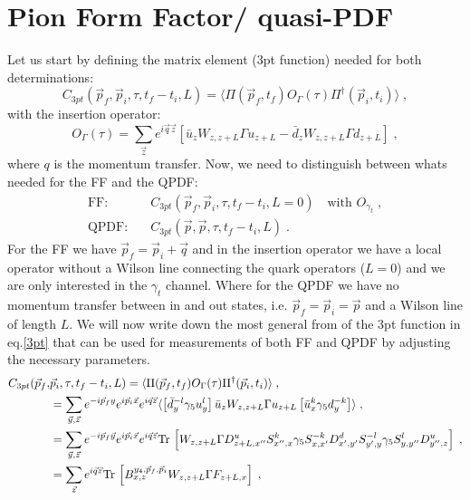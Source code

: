 \documentclass[a4paper,10pt]{scrartcl}
\newcommand{\tr}{\text{Tr\,}}
\begin{document}



\section{Pion Form Factor/ quasi-PDF}
Let us start by defining the matrix element (3pt function) needed for both determinations:
\begin{equation}
    C_{3pt}(\vec p_f,\vec p_i,\tau,t_f-t_i,L) = \langle \Pi (\vec p_f, t_f) O_{\Gamma}(\tau) \Pi^\dagger (\vec p_i, t_i) \rangle \; , \label{3pt}
\end{equation}
with the insertion operator:
\begin{equation}
    O_\Gamma(\tau) = \sum_{\vec z} e^{i \vec q \vec z} \left[ \bar u_z W_{z,z+L} \Gamma u_{z+L} - \bar d_z W_{z,z+L} \Gamma d_{z+L} \right] \; , \label{insert}
\end{equation}
where $q$ is the momentum transfer. Now, we need to distinguish between whats needed for the FF and the QPDF:
\begin{align}
    \text{FF}: \quad & C_{3pt}(\vec p_f,\vec p_i,\tau,t_f-t_i,L=0) \quad \text{with } O_{\gamma_t} \; , \\
    \text{QPDF:} \quad & C_{3pt}(\vec p,\vec p,\tau,t_f-t_i,L) \; .
\end{align}
For the FF we have $\vec p_f = \vec p_i + \vec q$ and in the insertion operator we have a local operator
without a Wilson line connecting the quark operators ($L=0$) and we are only interested in the $\gamma_t$ channel. Where for the QPDF
we have no momentum transfer between in and out states, i.e. $\vec p_f = \vec p_i = \vec p$ and a Wilson line of length $L$. We will now write down the most general
from of the 3pt function in eq.\eqref{3pt} that can be used for measurements of both FF and QPDF by adjusting the necessary parameters.
\begin{align}
    C_{3pt}(\vec p_f,&\vec p_i,\tau,t_f-t_i,L) = \langle \Pi (\vec p_f, t_f) O_{\Gamma}(\tau) \Pi^\dagger (\vec p_i, t_i) \rangle \; , \\
    &= \sum_{\vec y, \vec z} e^{-i \vec p_f y} e^{i \vec p_i \vec x} e^{i \vec q \vec z} \langle \left[\bar d^{-l}_y \gamma_5 u^l_y \right] \bar u_z W_{z,z+L} \Gamma u_{z+L}
    \left[\bar u^k_x \gamma_5 d^{-k}_y \right] \rangle \; ,\\
    &= \sum_{\vec y, \vec z} e^{-i \vec p_f \vec y} e^{i \vec p_i \vec x} e^{i \vec q \vec z} \tr \left[ W_{z,z+L} \Gamma D^u_{z+L,x''} S^k_{x'',x} \gamma_5
            S^{-k}_{x,x'} D^d_{x',y'} S^{-l}_{y',y} \gamma_5 S^l_{y,y''} D^u_{y'',z}   \right] \; , \\
    &= \sum_{\vec{z}} e^{i \vec q \vec z} \tr \left[B^{y_4,\vec p_f, \vec p_i}_{x,z} W_{z,z+L} \Gamma F_{z+L,x} \right] \; ,
\end{align}
\end{document}
